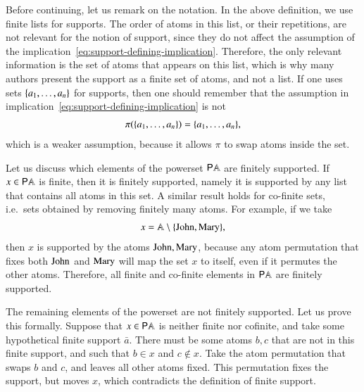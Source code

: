 Before continuing, let us remark on the notation. In the above definition, we use finite lists for supports. The order of atoms in this list, or their repetitions, are not relevant for the notion of support, since they do not affect the assumption of the implication~\eqref{eq:support-defining-implication}. Therefore, the only relevant information is the set of atoms that appears on this list, which is why many authors present the support as a  finite set of atoms, and not a list. If one uses sets $\{a_1,\ldots,a_n\}$ for supports, then one should remember that the assumption in implication~\eqref{eq:support-defining-implication} is not
\begin{align*}
    \pi(\{a_1,\ldots,a_n\}) = \{a_1,\ldots,a_n\},
\end{align*}
which is a weaker assumption, because it allows $\pi$ to swap atoms inside the set.



\begin{myexample}
    Let us discuss which elements of the powerset ${\mathsf P} \mathbb A$ are finitely supported. If $x \in {\mathsf P} \mathbb A$ is finite, then it is finitely  supported, namely it is supported by any list that contains all atoms in this set. A similar result holds for co-finite sets, i.e.~sets obtained by removing finitely many atoms. For example, if we take 
    \begin{align*}
    x = \mathbb A \setminus \{\text{John},\text{Mary}\},
    \end{align*}
    then  $x$ is  supported by the atoms $\text{John},\text{Mary}$, because any atom permutation that fixes both $\text{John}$ and $\text{Mary}$ will map the set $x$ to itself, even if it permutes the other atoms. Therefore, all finite and co-finite elements in ${\mathsf P} \mathbb A$ are finitely supported. 

    The remaining elements of the powerset are not finitely supported.  Let us prove this formally. Suppose that $x \in {\mathsf P} \mathbb A$ is neither finite nor cofinite, and take some hypothetical finite support $\bar a$. There must be some atoms $b,c$ that are not in this finite support, and such that $b \in x$ and $c \not \in x$. Take the atom permutation that swaps $b$ and $c$, and leaves all other atoms fixed. This permutation fixes the support, but moves $x$, which contradicts the definition of finite support.
\end{myexample}

